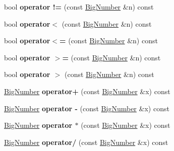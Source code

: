 \begin{DoxyCompactItemize}
bool {\bfseries operator !=} (const \mbox{\hyperlink{class_big_number}{Big\+Number}} \&n) const
\item 
\mbox{\label{class_big_number_afb834a72376a7874739994f244d23708}} 
bool {\bfseries operator$<$} (const \mbox{\hyperlink{class_big_number}{Big\+Number}} \&n) const
\item 
\mbox{\label{class_big_number_acb5b1357a051e3408cf49ce65cbbc596}} 
bool {\bfseries operator$<$=} (const \mbox{\hyperlink{class_big_number}{Big\+Number}} \&n) const
\item 
\mbox{\label{class_big_number_a85d462d63ba71621133c4de12182eb56}} 
bool {\bfseries operator $>$=} (const \mbox{\hyperlink{class_big_number}{Big\+Number}} \&n) const
\item 
\mbox{\label{class_big_number_a81f54187eff6405f4bd8d8cd135b1c48}} 
bool {\bfseries operator $>$} (const \mbox{\hyperlink{class_big_number}{Big\+Number}} \&n) const
\item 
\mbox{\label{class_big_number_a72518e2fdfa84e9adf59c2adbb3691ef}} 
\mbox{\hyperlink{class_big_number}{Big\+Number}} {\bfseries operator+} (const \mbox{\hyperlink{class_big_number}{Big\+Number}} \&x) const
\item 
\mbox{\label{class_big_number_a06439df85eacfd2fa5f27e17e041f833}} 
\mbox{\hyperlink{class_big_number}{Big\+Number}} {\bfseries operator -\/} (const \mbox{\hyperlink{class_big_number}{Big\+Number}} \&x) const
\item 
\mbox{\label{class_big_number_a6f179276680886413e3eec451e6c901b}} 
\mbox{\hyperlink{class_big_number}{Big\+Number}} {\bfseries operator $\ast$} (const \mbox{\hyperlink{class_big_number}{Big\+Number}} \&x) const
\item 
\mbox{\label{class_big_number_ab058552a72039734bad3bb56ad419d26}} 
\mbox{\hyperlink{class_big_number}{Big\+Number}} {\bfseries operator/} (const \mbox{\hyperlink{class_big_number}{Big\+Number}} \&x) const
\item 
\mbox{\label{class_big_number_a91069fd20ee87a5e413dd522b526e25a}} 

\end{DoxyCompactItemize}
